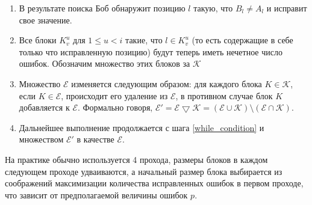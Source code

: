 \begin{enumerate}
  \item В результате поиска Боб обнаружит позицию $l$ такую, что $B_l \neq A_l$ и исправит свое значение. 
  
  \item Все блоки $K^u_v$ для $1 \leq u < i$ такие, что $l \in K^u_v$ (то есть содержащие в себе только что исправленную позицию) будут теперь иметь нечетное число ошибок. Обозначим множество этих блоков за $\mathcal{K}$
  
  \item Множество $\mathcal{E}$ изменяется следующим образом: для каждого блока $K \in \mathcal{K}$, если $K \in \mathcal{E}$, происходит его удаление из $\mathcal{E}$, в противном случае блок $K$ добавляется к $\mathcal{E}$. Формально говоря, $\mathcal{E}' = \mathcal{E} \bigtriangledown \mathcal{K} = (\mathcal{E} \cup \mathcal{K}) \setminus (\mathcal{E} \cap \mathcal{K})$.
  
  \item Дальнейшее выполнение продолжается с шага \ref{while_condition} и множеством $\mathcal{E}'$ в качестве $\mathcal{E}$.

\end{enumerate}
На практике обычно используется 4 прохода, размеры блоков в каждом следующем проходе удваиваются, а начальный размер блока выбирается из соображений максимизации количества исправленных ошибок в первом проходе, что зависит от предполагаемой величины ошибок $p$.

\begin{comment}
\subsubsection{Оценка количества информации, доступной подслушивателю}
В процессе коррекции ошибок используется открытый канал, который можно свободно подслушивать, оставаясь незамеченным. Нужно оценить, какое количество информации о ключе может получить злоумышленник за время работы протокола Cascade.

Согласно схеме протокола, на каждом шаге сначала раскрываются четности блоков, затем двоичным поиском исправляются ошибки в блоках с несовпадающими четностями.
Это дает (см \ref{cascade_analysis})
$$ \sum L_i = \sum_i ( \frac{n}{k_i} ~ + \sum(\log_2 k_i)) $$ бит дополнительной информации о ключе, доступной подслушивателю после окончания коррекции ошибок.
\end{comment}


